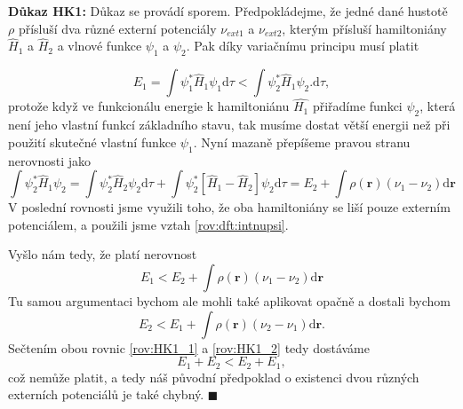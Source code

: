 \bigskip 
\textbf{Důkaz HK1:} Důkaz se provádí sporem. Předpokládejme, že jedné dané hustotě $\rho$ přísluší dva různé externí potenciály $\nu_{ext1}$ a $\nu_{ext2}$, kterým přísluší hamiltoniány $\hat{H}_1$ a $\hat{H}_2$ a vlnové funkce $\psi_1$ a $\psi_2$.  Pak díky variačnímu principu musí platit

\begin{equation}
E_1 = \int \psi_1^* \hat{H}_1 \psi_1 \mathrm{d}\tau < \int \psi_2^* \hat{H}_1 \psi_2 . \mathrm{d}\tau ,
\end{equation}
protože když ve funkcionálu energie k hamiltoniánu $\hat{H_1}$ přiřadíme funkci $\psi_2$, která není jeho vlastní funkcí základního stavu, tak musíme dostat větší energii než při použití skutečné vlastní funkce $\psi_1$. Nyní mazaně přepíšeme pravou stranu nerovnosti jako  
\begin{equation}
\int \psi_2^* \hat{H}_1 \psi_2 = \int \psi_2^* \hat{H}_2 \psi_2\mathrm{d}\tau  + \int \psi_2^* \left[\hat{H}_1-\hat{H}_2\right] \psi_2\mathrm{d}\tau = E_2 + \int \rho(\mathbf{r})(\nu_1-\nu_2)\mathrm{d}\mathbf{r}  
\end{equation}
V poslední rovnosti jsme využili toho, že oba hamiltoniány se liší pouze externím potenciálem, a použili jsme vztah \eqref{rov:dft:intnupsi}.

\noindent Vyšlo nám tedy, že platí nerovnost
\begin{equation}
E_1 < E_2+\int \rho(\mathbf{r})(\nu_1-\nu_2)\mathrm{d}\mathbf{r}
\label{rov:HK1_1}
\end{equation}
Tu samou argumentaci bychom ale mohli také aplikovat opačně a dostali bychom
\begin{equation}
E_2 < E_1+\int \rho(\mathbf{r})(\nu_2-\nu_1)\mathrm{d}\mathbf{r} .
\label{rov:HK1_2}
\end{equation}
Sečtením obou rovnic \eqref{rov:HK1_1} a \eqref{rov:HK1_2} tedy dostáváme
\begin{equation}
E_1 + E_2 < E_2 + E_1 ,
\end{equation}
což nemůže platit, a tedy náš původní předpoklad o existenci dvou různých externích potenciálů je také chybný.
\hfill {\footnotesize $\blacksquare$}

